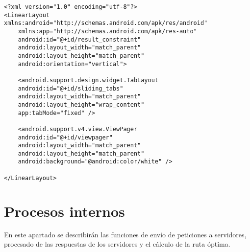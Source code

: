 \begin{lstlisting}[caption=Código XML de la vista con tabs]
<?xml version="1.0" encoding="utf-8"?>
<LinearLayout xmlns:android="http://schemas.android.com/apk/res/android"
	xmlns:app="http://schemas.android.com/apk/res-auto"
	android:id="@+id/result_constraint"
	android:layout_width="match_parent"
	android:layout_height="match_parent"
	android:orientation="vertical">

	<android.support.design.widget.TabLayout
	android:id="@+id/sliding_tabs"
	android:layout_width="match_parent"
	android:layout_height="wrap_content"
	app:tabMode="fixed" />
	
	<android.support.v4.view.ViewPager
	android:id="@+id/viewpager"
	android:layout_width="match_parent"
	android:layout_height="match_parent"
	android:background="@android:color/white" />

</LinearLayout>
\end{lstlisting}


\section[Procesos internos]{Procesos internos}
En este apartado se describirán las funciones de envío de peticiones a servidores, procesado de las respuestas de los servidores y el cálculo de la ruta óptima.
